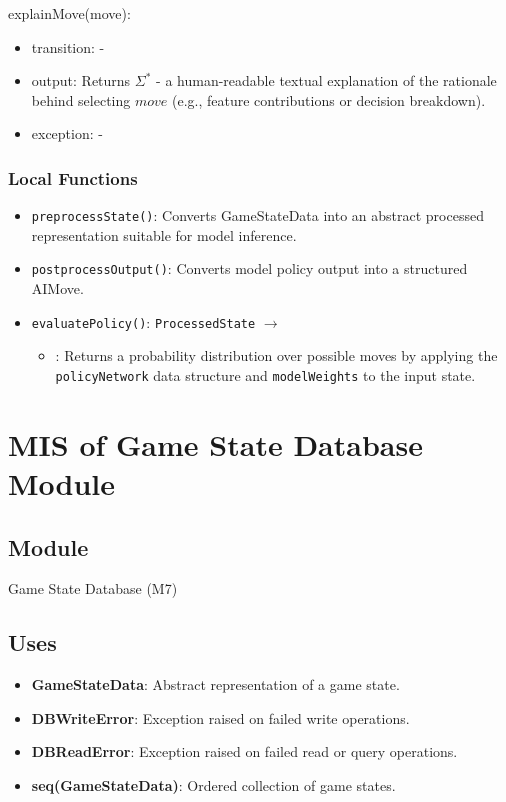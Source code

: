 \documentclass[12pt, titlepage]{article}
\begin{document}
\noindent explainMove(move):
\begin{itemize}
\item transition: -
\item output:  
      Returns $\Sigma^{*}$ - a human-readable textual explanation of the rationale  
      behind selecting $move$ (e.g., feature contributions or decision breakdown).
\item exception: -
\end{itemize}

\subsubsection{Local Functions}
\begin{itemize}
\item \texttt{preprocessState()}:
      Converts GameStateData into an abstract processed representation suitable  
      for model inference.

\item \texttt{postprocessOutput()}:
      Converts model policy output into a structured AIMove.
\item \texttt{evaluatePolicy()}: \texttt{ProcessedState} $\rightarrow$ 
\begin{itemize}
      \item {}: Returns a probability distribution over possible moves by applying the \texttt{policyNetwork} data structure and \texttt{modelWeights} to the input state.
\end{itemize}
\end{itemize}

\section{MIS of Game State Database Module} \label{M7}

\subsection{Module}
Game State Database (M7)

\subsection{Uses}

\begin{itemize}
    \item \textbf{GameStateData}: Abstract representation of a game state.
    \item \textbf{DBWriteError}: Exception raised on failed write operations.
    \item \textbf{DBReadError}: Exception raised on failed read or query operations.
    \item \textbf{seq(GameStateData)}: Ordered collection of game states.
\end{itemize}
\end{document}

